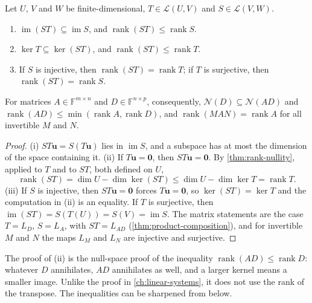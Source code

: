 \begin{proposition}
\label{prop:rank-composition}
Let $U$, $V$ and $W$ be finite-dimensional, $T\in\mathcal L(U,V)$ and $S\in\mathcal L(V,W)$.
\begin{enumerate}
\item $\operatorname{im}(ST)\subseteq\operatorname{im}S$, and $\operatorname{rank}(ST)\le\operatorname{rank}S$.
\item $\ker T\subseteq\ker(ST)$, and $\operatorname{rank}(ST)\le\operatorname{rank}T$.
\item If $S$ is injective, then $\operatorname{rank}(ST)=\operatorname{rank}T$; if $T$ is surjective, then $\operatorname{rank}(ST)=\operatorname{rank}S$.
\end{enumerate}
For matrices $A\in\mathbb F^{m\times n}$ and $D\in\mathbb F^{n\times p}$, consequently, $\mathcal N(D)\subseteq\mathcal N(AD)$ and $\operatorname{rank}(AD)\le\min(\operatorname{rank}A,\operatorname{rank}D)$, and $\operatorname{rank}(MAN)=\operatorname{rank}A$ for all invertible $M$ and $N$.
\end{proposition}

\begin{proof}
(i) $ST\mathbf u=S(T\mathbf u)$ lies in $\operatorname{im}S$, and a subspace has at most the dimension of the space containing it. (ii) If $T\mathbf u=\mathbf 0$, then $ST\mathbf u=\mathbf 0$. By \cref{thm:rank-nullity}, applied to $T$ and to $ST$, both defined on $U$,
\[
\operatorname{rank}(ST)=\dim U-\dim\ker(ST)\le\dim U-\dim\ker T=\operatorname{rank}T .
\]
(iii) If $S$ is injective, then $ST\mathbf u=\mathbf 0$ forces $T\mathbf u=\mathbf 0$, so $\ker(ST)=\ker T$ and the computation in (ii) is an equality. If $T$ is surjective, then $\operatorname{im}(ST)=S(T(U))=S(V)=\operatorname{im}S$. The matrix statements are the case $T=L_D$, $S=L_A$, with $ST=L_{AD}$ (\cref{thm:product-composition}), and for invertible $M$ and $N$ the maps $L_M$ and $L_N$ are injective and surjective.
\end{proof}

The proof of (ii) is the null-space proof of the inequality $\operatorname{rank}(AD)\le\operatorname{rank}D$: whatever $D$ annihilates, $AD$ annihilates as well, and a larger kernel means a smaller image. Unlike the proof in \cref{ch:linear-systems}, it does not use the rank of the transpose. The inequalities can be sharpened from below.

